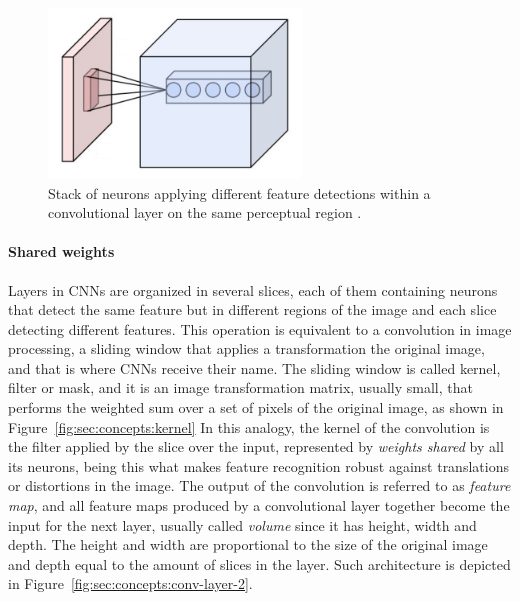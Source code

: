 \begin{figure}[htb]
  \begin{center}
    \includegraphics[width=0.6\textwidth]{gfx/conv-layer-1}
  \end{center}
  \caption{Stack of neurons applying different feature detections within a convolutional layer on the same perceptual region \cite{Aphex342015}.}
  \label{fig:sec:concepts:conv-layer-1}
\end{figure}

\paragraph{Shared weights}
Layers in CNNs are organized in several slices, each of them containing neurons that detect the same feature but in different regions of the image and each slice detecting different features.
This operation is equivalent to a convolution in image processing, a sliding window that applies a transformation the original image, and that is where CNNs receive their name.
The sliding window is called kernel, filter or mask, and it is an image transformation matrix, usually small, that performs the weighted sum over a set of pixels of the original image, as shown in Figure~\ref{fig:sec:concepts:kernel}
In this analogy, the kernel of the convolution is the filter applied by the slice over the input, represented by \emph{weights shared} by all its neurons, being this what makes feature recognition robust against translations or distortions in the image.
The output of the convolution is referred to as \emph{feature map}, and all feature maps produced by a convolutional layer together become the input for the next layer, usually called \emph{volume} since it has height, width and depth.
The height and width are proportional to the size of the original image and depth equal to the amount of slices in the layer.
Such architecture is depicted in Figure~\ref{fig:sec:concepts:conv-layer-2}.

